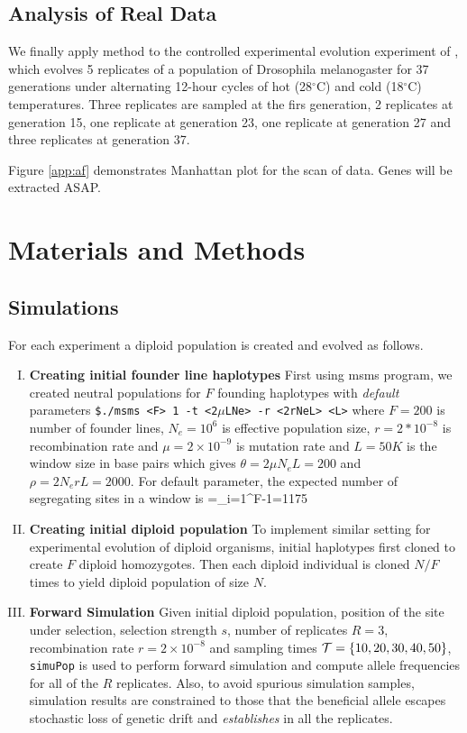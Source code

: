 \documentclass[11pt]{article}
\def\comale{\text{COMALE }}
\begin{document}
\subsection{Analysis of Real Data}
We finally apply \comale method to the controlled experimental evolution 
experiment 
of \cite{orozco2012adaptation}, which evolves 5 replicates of a population of 
Drosophila melanogaster for 37 generations under alternating 12-hour cycles of 
hot (28$^{\circ}$C) and cold (18$^{\circ}$C) temperatures. Three replicates are 
sampled at the firs generation, 2 replicates at generation 15, one replicate at 
generation 23, one replicate at generation 27 and three replicates at 
generation 37.

Figure \ref{app:af} demonstrates Manhattan plot for the scan of data. Genes 
will be extracted ASAP.

\section{Materials and Methods}
\subsection{Simulations}
For each experiment a diploid population is created and evolved as 
follows. 
\begin{enumerate}[I.]
	\item {\bf Creating initial founder line haplotypes}
	First using msms program, we created neutral populations for $F$ 
	founding 
	haplotypes with \emph{default} parameters \texttt{\$./msms <F> 1 
	-t 
		<2$\mu$LNe> 
		-r <2rNeL> 
		<L>} 
	where $F=200$ is number of founder lines, $N_e=10^6$ is 
	effective 
	population size, $r=2*10^{-8}$ is recombination rate and 
	$\mu=2\times 
	10^{-9}$ is mutation rate and  $L=50K$ is the window size in 
	base pairs 
	which gives $\theta=2\mu N_eL=200$ and $\rho=2N_erL=2000$. 
	For 
	default 
	parameter, the expected number of segregating sites in a window 
	is 
	\beqq
	\Ebb[M]=\theta \sum_{i=1}^{F-1}=1175
	\eeqq
	\item{\bf Creating initial diploid population} 
	To implement similar setting for experimental evolution of diploid 
	organisms, 
	initial  haplotypes first cloned to create $F$ diploid homozygotes. 
	Then 
	each 
	diploid individual is  cloned $N/F$ times to yield diploid 
	population of 
	size 
	$N$.
	\item{\bf Forward Simulation}
	Given initial diploid population, position of the site under 
	selection, 
	selection 
	strength $s$, number of replicates $R=3$, recombination rate 
	$r=2\times10^{-8}$ 
	and sampling times ${\cal T}=\{10,20,30,40,50\}$, \texttt{simuPop} is 
	used to 
	perform
	forward simulation and  compute allele frequencies for all of the 
	$R$ 
	replicates. Also, to avoid spurious simulation samples, simulation 
	results 
	are constrained to those that the beneficial allele escapes 
	stochastic loss 
	of genetic drift and \emph{establishes} in all the replicates. 
\end{enumerate}
\end{document}
